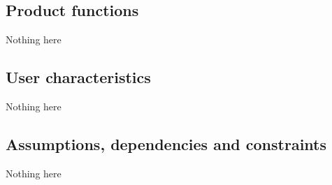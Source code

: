 \subsection{Product functions}
Nothing here

\subsection{User characteristics}
Nothing here

\subsection{Assumptions, dependencies and constraints}
Nothing here
